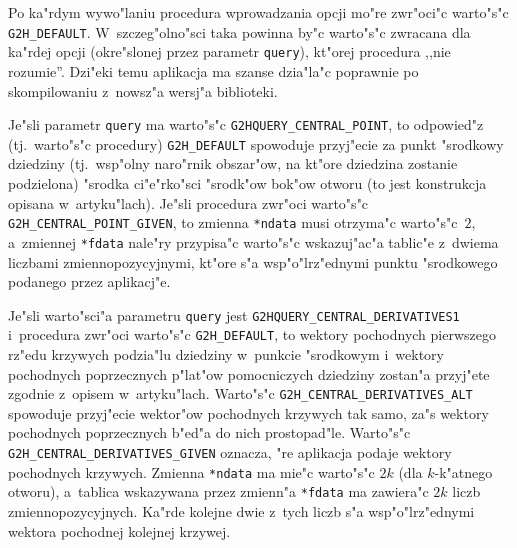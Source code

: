 \vspace{\bigskipamount}
\begin{sloppypar}
Po ka"rdym wywo"laniu procedura wprowadzania opcji mo"re zwr"oci"c warto"s"c
\texttt{G2H\_DEFAULT}. W~szczeg"olno"sci taka powinna by"c warto"s"c zwracana
dla ka"rdej opcji (okre"slonej przez parametr \texttt{query}), kt"orej procedura
,,nie rozumie''. Dzi"eki temu aplikacja ma szanse dzia"la"c poprawnie po
skompilowaniu z~nowsz"a wersj"a biblioteki.%
\end{sloppypar}

Je"sli parametr \texttt{query} ma warto"s"c \texttt{G2HQUERY\_CENTRAL\_POINT},
to odpowied"z (tj.\ warto"s"c procedury) \texttt{G2H\_DEFAULT} spowoduje
przyj"ecie za punkt "srodkowy dziedziny (tj.\ wsp"olny naro"rnik obszar"ow,
na kt"ore dziedzina zostanie podzielona) "srodka ci"e"rko"sci "srodk"ow
bok"ow otworu (to jest konstrukcja opisana w~artyku"lach).
Je"s\-li procedura zwr"oci warto"s"c \texttt{G2H\_CENTRAL\_POINT\_GIVEN}, to
zmienna \texttt{*ndata} musi otrzyma"c warto"s"c~$2$, a~zmiennej \texttt{*fdata}
nale"ry przypisa"c warto"s"c wskazuj"ac"a tablic"e z~dwiema liczbami
zmiennopozycyjnymi, kt"ore s"a wsp"o"lrz"ednymi punktu "srodkowego podanego
przez aplikacj"e.

Je"sli warto"sci"a parametru \texttt{query} jest
\texttt{G2HQUERY\_CENTRAL\_DERIVATIVES1} i~procedura zwr"oci warto"s"c
\texttt{G2H\_DEFAULT}, to wektory pochodnych pierwszego rz"edu krzywych
podzia"lu dziedziny w~punkcie "srodkowym i~wektory pochodnych poprzecznych
p"lat"ow pomocniczych dziedziny zostan"a przyj"ete zgodnie z~opisem
w~artyku"lach. Warto"s"c \texttt{G2H\_CENTRAL\_DERIVATIVES\_ALT} spowoduje
przyj"ecie wektor"ow pochodnych krzywych tak samo, za"s wektory pochodnych
poprzecznych b"ed"a do nich prostopad"le. Warto"s"c
\texttt{G2H\_CENTRAL\_DERIVATIVES\_GIVEN} oznacza, "re aplikacja podaje
wektory pochodnych krzywych. Zmienna \texttt{*ndata} ma mie"c warto"s"c
$2k$ (dla $k$-k"atnego otworu), a~tablica wskazywana przez zmienn"a
\texttt{*fdata} ma zawiera"c $2k$ liczb zmiennopozycyjnych. Ka"rde kolejne
dwie z~tych liczb s"a wsp"o"lrz"ednymi wektora pochodnej kolejnej krzywej.

